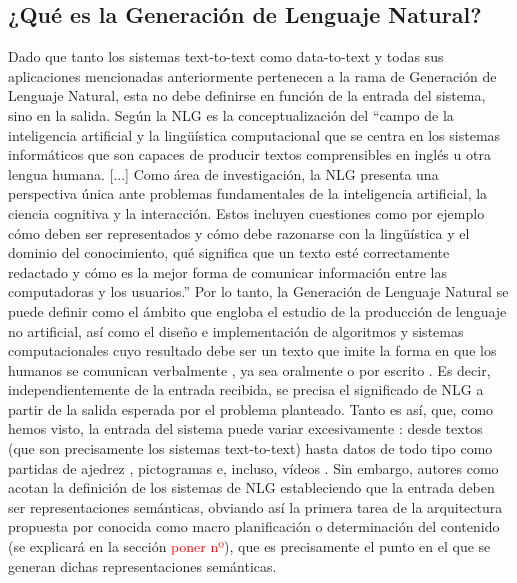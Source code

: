 \subsection{¿Qué es la Generación de Lenguaje Natural?}
Dado que tanto los sistemas text-to-text como data-to-text y todas sus aplicaciones mencionadas anteriormente pertenecen a la rama de Generación de Lenguaje Natural, esta no debe definirse en función de la entrada del sistema, sino en la salida. Según \cite{biblia} la NLG es la conceptualización del ``campo de la inteligencia artificial y la lingüística computacional que se centra en los sistemas informáticos que son capaces de producir textos comprensibles en inglés u otra lengua humana. [...] Como área de investigación, la NLG presenta una perspectiva única ante problemas fundamentales de la inteligencia artificial, la ciencia cognitiva y la interacción. Estos incluyen cuestiones como por ejemplo cómo deben ser representados y cómo debe razonarse con la lingüística y el dominio del conocimiento, qué significa que un texto esté correctamente redactado y cómo es la mejor forma de comunicar información entre las computadoras y los usuarios.'' Por lo tanto, la Generación de Lenguaje Natural se puede definir como el ámbito que engloba el estudio de la producción de lenguaje no artificial, así como el diseño e implementación de algoritmos y sistemas computacionales cuyo resultado debe ser un texto que imite la forma en que los humanos se comunican verbalmente \citep{vicente2015generacion}, ya sea oralmente o por escrito \citep{del2007que}. Es decir, independientemente de la entrada recibida, se precisa el significado de NLG a partir de la salida esperada por el problema planteado. Tanto es así, que, como hemos visto, la entrada del sistema puede variar excesivamente \citep{mcdonald1993issues}: desde textos (que son precisamente los sistemas text-to-text) hasta datos de todo tipo como partidas de ajedrez \citep{gervas2014composing}, pictogramas \citep{gonzalez2019traductor} e, incluso, vídeos \citep{thomason2014integrating}. Sin embargo, autores como \cite{duvsek2020evaluating} acotan la definición de los sistemas de NLG estableciendo que la entrada deben ser representaciones semánticas, obviando así la primera tarea de la arquitectura propuesta por \cite{biblia} conocida como macro planificación o determinación del contenido (se explicará en la sección \textcolor{red}{poner nº}), que es precisamente el punto en el que se generan dichas representaciones semánticas.

